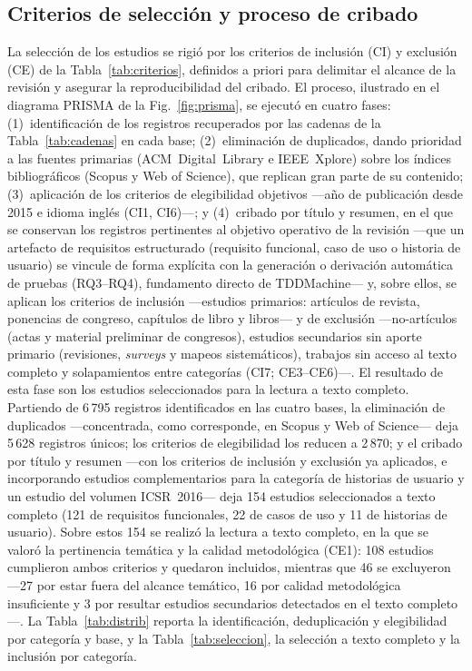 \documentclass[10pt,journal,twoside,letterpaper]{IEEEtran}
\begin{document}
	\subsection{Criterios de selección y proceso de cribado}
	\label{subsec:seleccion}
	
	La selección de los estudios se rigió por los criterios de inclusión (CI) y exclusión (CE) de la Tabla~\ref{tab:criterios}, definidos a priori para delimitar el alcance de la revisión y asegurar la reproducibilidad del cribado. El proceso, ilustrado en el diagrama PRISMA de la Fig.~\ref{fig:prisma}, se ejecutó en cuatro fases: (1)~identificación de los registros recuperados por las cadenas de la Tabla~\ref{tab:cadenas} en cada base; (2)~eliminación de duplicados, dando prioridad a las fuentes primarias (ACM~Digital~Library e IEEE~Xplore) sobre los índices bibliográficos (Scopus y Web of Science), que replican gran parte de su contenido; (3)~aplicación de los criterios de elegibilidad objetivos ---año de publicación desde 2015 e idioma inglés (CI1, CI6)---; y (4)~cribado por título y resumen, en el que se conservan los registros pertinentes al objetivo operativo de la revisión ---que un artefacto de requisitos estructurado (requisito funcional, caso de uso o historia de usuario) se vincule de forma explícita con la generación o derivación automática de pruebas (RQ3--RQ4), fundamento directo de TDDMachine--- y, sobre ellos, se aplican los criterios de inclusión ---estudios primarios: artículos de revista, ponencias de congreso, capítulos de libro y libros--- y de exclusión ---no-artículos (actas y material preliminar de congresos), estudios secundarios sin aporte primario (revisiones, \emph{surveys} y mapeos sistemáticos), trabajos sin acceso al texto completo y solapamientos entre categorías (CI7; CE3--CE6)---. El resultado de esta fase son los estudios seleccionados para la lectura a texto completo. Partiendo de 6\,795 registros identificados en las cuatro bases, la eliminación de duplicados ---concentrada, como corresponde, en Scopus y Web of Science--- deja 5\,628 registros únicos; los criterios de elegibilidad los reducen a 2\,870; y el cribado por título y resumen ---con los criterios de inclusión y exclusión ya aplicados, e incorporando estudios complementarios para la categoría de historias de usuario y un estudio del volumen ICSR~2016--- deja 154 estudios seleccionados a texto completo (121 de requisitos funcionales, 22 de casos de uso y 11 de historias de usuario). Sobre estos 154 se realizó la lectura a texto completo, en la que se valoró la pertinencia temática y la calidad metodológica (CE1): 108 estudios cumplieron ambos criterios y quedaron incluidos, mientras que 46 se excluyeron ---27 por estar fuera del alcance temático, 16 por calidad metodológica insuficiente y 3 por resultar estudios secundarios detectados en el texto completo---. La Tabla~\ref{tab:distrib} reporta la identificación, deduplicación y elegibilidad por categoría y base, y la Tabla~\ref{tab:seleccion}, la selección a texto completo y la inclusión por categoría.
	
\end{document}
